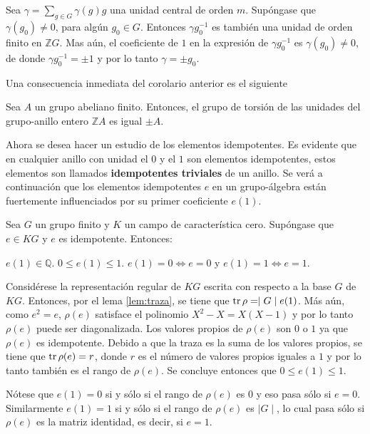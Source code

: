 \begin{proof*}
Sea $\gamma = \sum_{g \in G}\gamma(g)g$ una unidad central de orden $m$. Supóngase que $\gamma(g_0) \neq 0$, para algún $g_0 \in G$. Entonces $\gamma g_0^{-1}$ es también una unidad de orden finito en $\mathds{Z}G$. Mas aún, el coeficiente de $1$ en la expresión de $\gamma g_0^{-1}$ es $\gamma(g_0) \neq 0$, de donde $\gamma g_0^{-1} = \pm 1$ y por lo tanto $\gamma = \pm g_0$.
\end{proof*}
Una consecuencia inmediata del corolario anterior es el siguiente
\begin{teorema}\label{teo:Graham-Higman}
Sea $A$ un grupo abeliano finito. Entonces, el grupo de torsión de las unidades del grupo-anillo entero $\mathds{Z}A$ es igual $\pm A$.
\end{teorema}

Ahora se desea hacer un estudio de los elementos idempotentes. Es evidente que en cualquier anillo con unidad el $0$ y el $1$ son elementos idempotentes, estos elementos son llamados \textbf{idempotentes triviales} de un anillo. Se verá a continuación que los elementos idempotentes $e$ en un grupo-álgebra están fuertemente influenciados por su primer coeficiente $e(1)$.

\begin{teorema}\label{teo:idme}
Sea $G$ un grupo finito y $K$ un campo de característica cero. Supóngase que $e \in KG$ y $e$ es idempotente. Entonces:
\begin{bulletList}
\newItem $e(1) \in \mathds{Q}$.
\newItem $0 \leq e(1) \leq 1$.
\newItem $e(1) = 0 \Leftrightarrow e = 0$ y $e(1) = 1 \Leftrightarrow e=1$.   
\end{bulletList} 
\end{teorema}
\begin{proof*}
Considérese la representación regular de $KG$ escrita con respecto a la base $G$ de $KG$. Entonces, por el lema \ref{lem:traza}, se tiene que $\operatorname{tr}\rho = \mid G \mid e(1)$. Más aún, como $e^2 = e$, $\rho(e)$ satisface el polinomio $X^2 - X = X(X-1)$ y por lo tanto $\rho(e)$ puede ser diagonalizada. Los valores propios de $\rho(e)$ son $0$ o $1$ ya que $\rho(e)$ es idempotente. Debido a que la traza es la suma de los valores propios, se tiene que $\operatorname{tr}\rho(e) = r$, donde $r$ es el número de valores propios iguales a $1$ y por lo tanto también es el rango de $\rho(e)$. Se concluye entonces que $0\leq e(1) \leq 1$.

Nótese que $e(1) = 0 $ si y sólo si el rango de $\rho(e)$ es $0$ y eso pasa sólo si $e = 0$. Similarmente $e(1) = 1$ si y sólo si el rango de $\rho(e)$ es $\mid G \mid $, lo cual pasa sólo si $\rho(e)$ es la matriz identidad, es decir, si $e = 1$. 
\end{proof*} 
